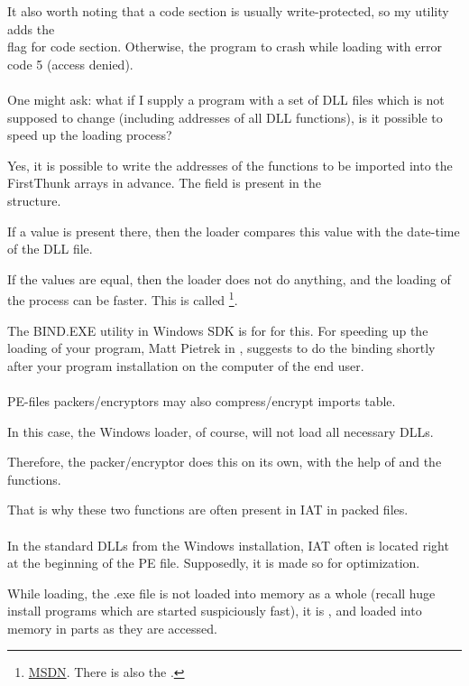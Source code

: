 It also worth noting that a code section is usually write-protected, so my utility adds the \\
flag for code section. Otherwise, the program to crash while loading with error code
5 (access denied). \\
\\
One might ask: what if I supply a program with a set of DLL files which is not supposed to change (including addresses of all DLL functions),
is it possible to speed up the loading process?

Yes, it is possible to write the addresses of the functions to be imported into the FirstThunk arrays in advance.
The  field is present in the \\
 structure.

If a value is present there, then the loader compares this value with the date-time of the DLL file.

If the values are equal, then the loader does not do anything, and the loading of the process can be faster.
This is called 
\footnote{\href{http://go.yurichev.com/17050}{MSDN}. There is also the .}.

The BIND.EXE utility in Windows SDK is for for this.
For speeding up the loading of your program, Matt Pietrek in \PietrekPEURL, suggests to do the binding shortly after your program
installation on the computer of the end user. \\
\\
PE-files packers/encryptors may also compress/encrypt imports table.

In this case, the Windows loader, of course, will not load all necessary DLLs.

Therefore, the packer/encryptor does this on its own, with the help of 
 and the  functions.

That is why these two functions are often present in \ac{IAT} in packed files.\\
\\
In the standard DLLs from the Windows installation, \ac{IAT} often is located right at the beginning of the PE file.
Supposedly, it is made so for optimization.

While loading, the .exe file is not loaded into memory as a whole (recall huge install programs which are
started suspiciously fast), it is , and loaded into memory in parts as they are accessed.

